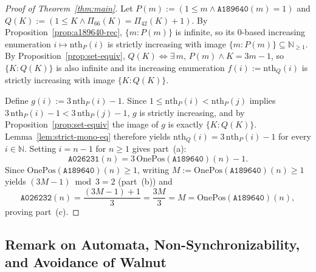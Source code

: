 \documentclass[11pt]{article}
\theoremstyle{definition}
\newcommand{\N}{\mathbb{N}}
\newcommand{\seq}[1]{\texttt{#1}}
\newcommand{\OnePos}{\mathrm{OnePos}}
\begin{document}
\begin{proof}[Proof of Theorem~\ref{thm:main}]
Let $P(m) := (1 \le m \wedge \seq{A189640}(m) = 1)$ and $Q(K) := (1 \le K \wedge \Pi_{66}(K) = \Pi_{42}(K) + 1)$. By Proposition~\ref{prop:a189640-rec}, $\{m : P(m)\}$ is infinite, so its $0$-based increasing enumeration $i \mapsto \mathrm{nth}_P(i)$ is strictly increasing with image $\{m : P(m)\} \subseteq \N_{\ge 1}$. By Proposition~\ref{prop:set-equiv}, $Q(K) \iff \exists\, m,\, P(m) \wedge K = 3m - 1$, so $\{K : Q(K)\}$ is also infinite and its increasing enumeration $f(i) := \mathrm{nth}_Q(i)$ is strictly increasing with image $\{K : Q(K)\}$.

Define $g(i) := 3\,\mathrm{nth}_P(i) - 1$. Since $1 \le \mathrm{nth}_P(i) < \mathrm{nth}_P(j)$ implies $3\,\mathrm{nth}_P(i) - 1 < 3\,\mathrm{nth}_P(j) - 1$, $g$ is strictly increasing, and by Proposition~\ref{prop:set-equiv} the image of $g$ is exactly $\{K : Q(K)\}$. Lemma~\ref{lem:strict-mono-eq} therefore yields $\mathrm{nth}_Q(i) = 3\,\mathrm{nth}_P(i) - 1$ for every $i \in \N$. Setting $i = n - 1$ for $n \ge 1$ gives part~(a):
\[
\seq{A026231}(n) = 3\,\OnePos(\seq{A189640})(n) - 1.
\]
Since $\OnePos(\seq{A189640})(n) \ge 1$, writing $M := \OnePos(\seq{A189640})(n) \ge 1$ yields $(3M - 1) \bmod 3 = 2$ (part~(b)) and
\[
\seq{A026232}(n) = \frac{(3M - 1) + 1}{3} = \frac{3M}{3} = M = \OnePos(\seq{A189640})(n),
\]
proving part~(c).
\end{proof}

\subsection{Remark on Automata, Non-Synchronizability, and Avoidance of Walnut}
\end{document}
